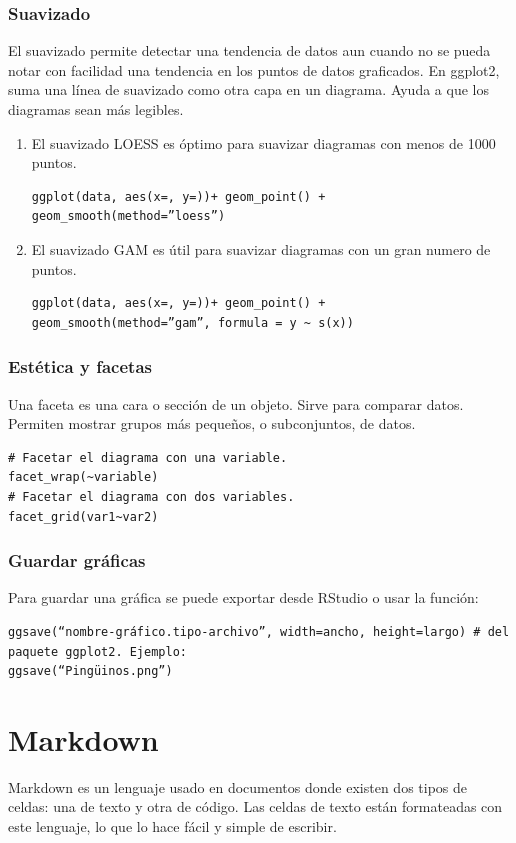 \documentclass[a4paper, 12pt]{book}
\begin{document}
\subsection{Suavizado}
El suavizado permite detectar una tendencia de datos aun cuando no se pueda notar con facilidad una tendencia en los puntos de datos graficados. En ggplot2, suma una línea de suavizado como otra capa en un diagrama. Ayuda a que los diagramas sean más legibles.
\begin{enumerate}
\item El suavizado LOESS es óptimo para suavizar diagramas con menos de 1000 puntos.
\begin{verbatim}
ggplot(data, aes(x=, y=))+ geom_point() + geom_smooth(method=”loess”)
\end{verbatim}
\item El suavizado GAM es útil para suavizar diagramas con un gran numero de puntos.
\begin{verbatim}
ggplot(data, aes(x=, y=))+ geom_point() +  geom_smooth(method=”gam”, formula = y ~ s(x))
\end{verbatim}
\end{enumerate}
\subsection{Estética y facetas}
Una faceta es una cara o sección de un objeto. Sirve para comparar datos. Permiten mostrar grupos más pequeños, o subconjuntos, de datos.
\begin{verbatim}
# Facetar el diagrama con una variable.
facet_wrap(~variable)
# Facetar el diagrama con dos variables.
facet_grid(var1~var2)
\end{verbatim}
\subsection{Guardar gráficas}
Para guardar una gráfica se puede exportar desde RStudio o usar la función:
\begin{verbatim} 
ggsave(“nombre-gráfico.tipo-archivo”, width=ancho, height=largo) # del paquete ggplot2. Ejemplo:
ggsave(“Pingüinos.png”)
\end{verbatim}
%
\chapter{Markdown}
Markdown es un lenguaje usado en documentos donde existen dos tipos de celdas: una de texto y otra de código. Las celdas de texto están formateadas con este lenguaje, lo que lo hace fácil y simple de escribir.
\end{document}
